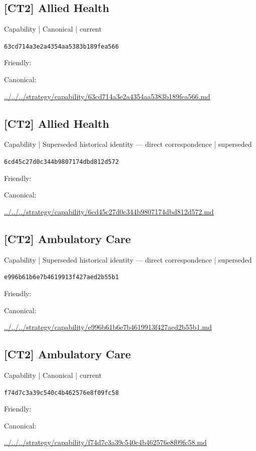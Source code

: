 \documentclass[10pt,a4paper]{article}
\begin{document}
\subsection*{[CT2] Allied Health}
{\small Capability | Canonical | current}\par
\texttt{63cd714a3e2a4354aa5383b189fea566}\par
Friendly: \par
Canonical: \par
{\footnotesize\url{../../../strategy/capability/63cd714a3e2a4354aa5383b189fea566.md}}\par
\subsection*{[CT2] Allied Health}
{\small Capability | Superseded historical identity — direct correspondence | superseded}\par
\texttt{6cd45c27d0c344b9807174dbd812d572}\par
Friendly: \par
Canonical: \par
{\footnotesize\url{../../../strategy/capability/6cd45c27d0c344b9807174dbd812d572.md}}\par
\subsection*{[CT2] Ambulatory Care}
{\small Capability | Superseded historical identity — direct correspondence | superseded}\par
\texttt{e996b61b6e7b4619913f427aed2b55b1}\par
Friendly: \par
Canonical: \par
{\footnotesize\url{../../../strategy/capability/e996b61b6e7b4619913f427aed2b55b1.md}}\par
\subsection*{[CT2] Ambulatory Care}
{\small Capability | Canonical | current}\par
\texttt{f74d7c3a39c540c4b462576e8f09fc58}\par
Friendly: \par
Canonical: \par
{\footnotesize\url{../../../strategy/capability/f74d7c3a39c540c4b462576e8f09fc58.md}}\par
\end{document}
